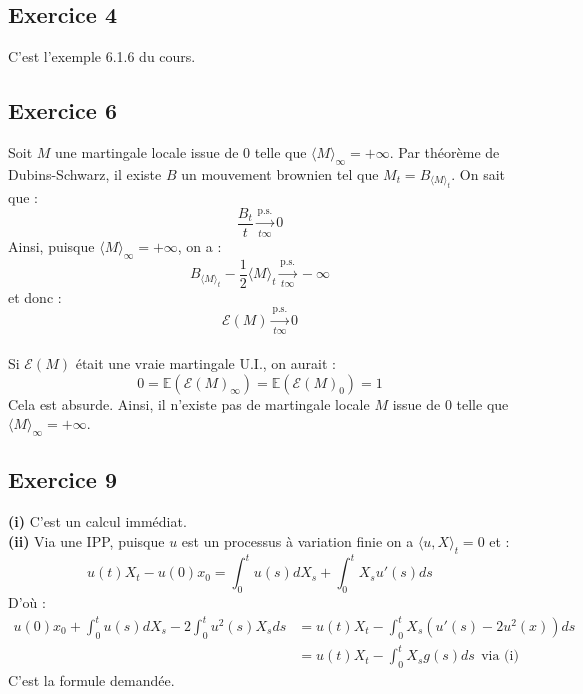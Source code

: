 \documentclass[a4paper,12pt]{article}
\newcommand{\E}{\mathbb{E}}
\newcommand{\sme}{\mathcal{E}}
\begin{document}
\subsection{Exercice 4}
C'est l'exemple 6.1.6 du cours.

\subsection{Exercice 6}
Soit $M$ une martingale locale issue de $0$ telle que $\langle M \rangle_{\infty} = + \infty$. Par théorème de Dubins-Schwarz, il existe $B$ un mouvement brownien tel que $M_t = B_{\langle M \rangle_t}$. On sait que :
$$\frac{B_t}{t} \xrightarrow[t \infty]{\text{p.s.}} 0$$
Ainsi, puisque $\langle M \rangle_{\infty} = + \infty$, on a : 
$$B_{\langle M \rangle_t} - \frac{1}{2} \langle M \rangle_t \xrightarrow[t \infty]{\text{p.s.}} - \infty$$
et donc : 
$$\sme (M) \xrightarrow[t \infty]{\text{p.s.}} 0$$ \\

Si $\sme (M)$ était une vraie martingale U.I., on aurait :
$$0 = \E (\sme (M)_{\infty}) = \E (\sme (M)_0) = 1$$
Cela est absurde. Ainsi, il n'existe pas de martingale locale $M$ issue de $0$ telle que $\langle M \rangle_{\infty} = + \infty$. 

\subsection{Exercice 9}
\textbf{(i)} C'est un calcul immédiat. \\

\textbf{(ii)} Via une IPP, puisque $u$ est un processus à variation finie on a $\langle u, X \rangle_t = 0$ et :
$$u(t)X_t-u(0)x_0 = \int_0^t u(s) dX_s + \int_0^t X_s u'(s) ds$$
D'où :
\begin{align*}
u(0) x_0 + \int_0^t u(s) dX_s -2\int_0^t u^2(s) X_s ds & = u(t) X_t - \int_0^t X_s (u'(s)-2u^2(x))ds \\
& = u(t) X_t - \int_0^t X_s g(s) ds \ \ \text{via (i)}
\end{align*}
C'est la formule demandée. \\
\end{document}
